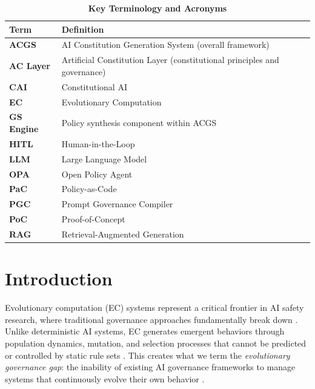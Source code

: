\documentclass[sigconf,natbib]{acmart}
\newcommand{\tablesize}{\footnotesize} %
\newcommand{\tablenumfmt}[1]{\textbf{#1}} %
\newcommand{\tableheader}[1]{\textbf{#1}} %
\begin{document}
\begin{table}[h]
  \centering
  \tablesize
  \caption{\textbf{Key Terminology and Acronyms}}
  \label{tab:glossary}
  \begin{tabularx}{\columnwidth}{@{}p{1.8cm}X@{}}
    \toprule
    \tableheader{Term} & \tableheader{Definition} \\
    \midrule
    \tablenumfmt{ACGS} & AI Constitution Generation System (overall framework) \\
    \tablenumfmt{AC Layer} & Artificial Constitution Layer (constitutional principles and governance) \\
    \tablenumfmt{CAI} & Constitutional AI \\
    \tablenumfmt{EC} & Evolutionary Computation \\
    \tablenumfmt{GS Engine} & Policy synthesis component within ACGS \\
    \tablenumfmt{HITL} & Human-in-the-Loop \\
    \tablenumfmt{LLM} & Large Language Model \\
    \tablenumfmt{OPA} & Open Policy Agent \\
    \tablenumfmt{PaC} & Policy-as-Code \\
    \tablenumfmt{PGC} & Prompt Governance Compiler \\
    \tablenumfmt{PoC} & Proof-of-Concept \\
    \tablenumfmt{RAG} & Retrieval-Augmented Generation \\
    \bottomrule
  \end{tabularx}
\end{table}

\section{Introduction}
\label{sec:introduction}
Evolutionary computation (EC) systems represent a critical frontier in AI safety research, where traditional governance approaches fundamentally break down \cite{Chauhan2025ECLLMSurvey}. Unlike deterministic AI systems, EC generates emergent behaviors through population dynamics, mutation, and selection processes that cannot be predicted or controlled by static rule sets \cite{Nordin2024LLMGP}. This creates what we term the \textit{evolutionary governance gap}: the inability of existing AI governance frameworks to manage systems that continuously evolve their own behavior \cite{Taeihagh2025Governing, WorldBank2024AIGovernance}.
\end{document}

